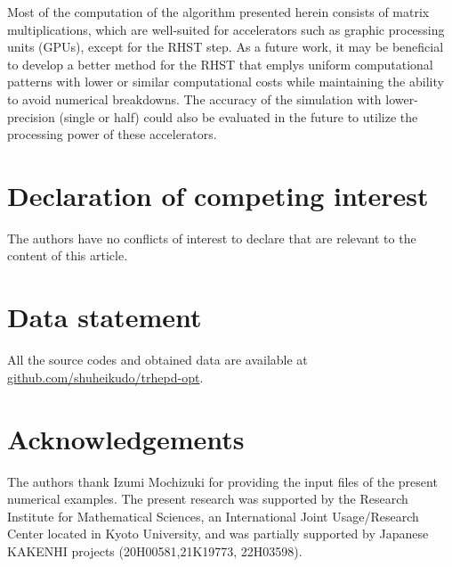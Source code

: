 \documentclass[preprint, 5p, times, sort&compress]{elsarticle}
\begin{document}
        Most of the computation of the algorithm presented herein consists of  matrix multiplications, which are well-suited for accelerators such as graphic processing units (GPUs), except for the RHST step.
        As a future work, it may be beneficial to develop a better method for the RHST that emplys uniform computational patterns with lower or similar computational costs while maintaining the ability to avoid numerical breakdowns.
        The accuracy of the simulation with lower-precision (single or half) could also be evaluated in the future
        to utilize the processing power of these accelerators.

        \section*{Declaration of competing interest}
        The authors have no conflicts of interest to declare that are relevant to the content of this article.

        \section*{Data statement}
        All the source codes and obtained data are available at \url{github.com/shuheikudo/trhepd-opt}.

        \section*{Acknowledgements}
        The authors thank Izumi Mochizuki for providing the input files of the present numerical examples. The present research 
        was supported by the Research Institute for Mathematical Sciences,        an International Joint Usage/Research Center located in Kyoto University,        and was partially supported by Japanese KAKENHI projects (20H00581,21K19773, 22H03598). 

        
        
\end{document}
